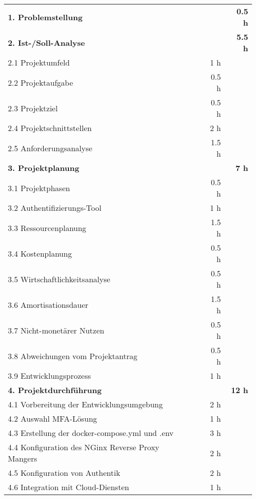 \begin{tabularx}{\textwidth}{Xrrr}
\rowcolor{heading}\textbf{1. Problemstellung} & \textbf{} & \textbf{} & \textbf{0.5 h} \\
\rowcolor{heading}\textbf{2. Ist-/Soll-Analyse} & \textbf{} & \textbf{} & \textbf{5.5 h} \\
2.1 Projektumfeld &       &    1 h   &  \\
\rowcolor{odd}2.2 Projektaufgabe  &       &    0.5 h   &  \\
2.3 Projektziel &       &   0.5 h    &  \\
\rowcolor{odd}2.4 Projektschnittstellen &      &   2 h    &  \\
2.5 Anforderungsanalyse &       &   1.5 h   &  \\
\rowcolor{heading}\textbf{3. Projektplanung} & \textbf{} & \textbf{} & \textbf{7 h} \\
3.1 Projektphasen &       &    0.5 h    &  \\
\rowcolor{odd}3.2 Authentifizierungs-Tool &       &    1 h   &  \\
3.3 Ressourcenplanung &        &    1.5 h   &    \\
\rowcolor{odd}3.4 Kostenplanung  &       &    0.5 h   &  \\
3.5 Wirtschaftlichkeitsanalyse &       &   0.5 h    &  \\
\rowcolor{odd}3.6 Amortisationsdauer &      &   1.5 h    &  \\
3.7 Nicht-monetärer Nutzen &        &    0.5 h   &    \\
\rowcolor{odd}3.8 Abweichungen vom Projektantrag  &       &    0.5 h   &  \\
3.9 Entwicklungsprozess &       &   1 h    &  \\
\rowcolor{heading}\textbf{4. Projektdurchführung} & \textbf{} & \textbf{} & \textbf{12 h} \\
4.1 Vorbereitung der Entwicklungsumgebung &       &    2 h   &  \\
\rowcolor{odd}4.2 Auswahl MFA-Lösung &      &   1 h   &    \\
4.3 Erstellung der docker-compose.yml und .env &       &    3 h   &  \\
\rowcolor{odd}4.4 Konfiguration des NGinx Reverse Proxy Mangers &      &   2 h   &    \\
4.5 Konfiguration von Authentik &       &    2 h   &  \\
\rowcolor{odd}4.6 Integration mit Cloud-Diensten &      &   1 h   &    \\

\end{tabularx}
